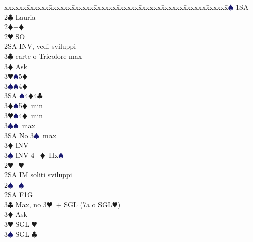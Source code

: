 \documentclass[a4paper,italian]{article}
\newcommand{\BC}{\textcolor{OliveGreen}{$\clubsuit$}}
\newcommand{\BD}{\textcolor{RedOrange}{$\vardiamondsuit$}}
\newcommand{\BH}{\textcolor{Red2}{$\varheartsuit${}}}
\newcommand{\BS}{\textcolor{MidnightBlue}{$\spadesuit${}}}
\newenvironment{bidtable}
{\begin{tabbing}

    xxxxxx\=xxxxxx\=xxxxxx\=xxxxxx\=xxxxxx\=xxxxxx\=xxxxxx\=xxxxxx\=xxxxxx\=xxxxxx\=\kill}
{\end{tabbing} }%
\begin{document}
\begin{multicols}{2}
                                        \begin{bidtable}
                                            1\BS-1SA\+\\
                                            2\BC \> Lauria\\
                                            2\BD {}+\BD \+\\
                                            2\BH \> SO\\
                                            2SA \> INV, vedi sviluppi\+\\
                                            3\BC {} carte o Tricolore max\+\\
                                            3\BD \> Ask\+\\
                                            3\BH {}\BS 5\BD \\
                                            3\BS {}\BS 4\BD \\
                                            3SA \BS 4\BD 4\BC \-\-\\
                                            3\BD {}\BS 5\BD\ min\\
                                            3\BH {}\BS 4\BD\ min\\
                                            3\BS {}\BS\ max\\
                                            3SA \> No 3\BS\ max\-\\
                                            3\BD \> INV\\
                                            3\BS \> INV 4+\BD\ Hx\BS \-\\
                                            2\BH {}+\BH \+\\
                                            2SA \> IM soliti sviluppi\-\\
                                            2\BS {}+\BS \+\\
                                            2SA \> F1G\+\\
                                            3\BC \> Max, no 3\BH\ + SGL (7a o SGL\BH)\+\\
                                            3\BD \> Ask\+\\
                                            3\BH \> SGL \BH \\
                                            3\BS \> SGL \BC \\

\end{bidtable}
\end{multicols}
\end{document}
